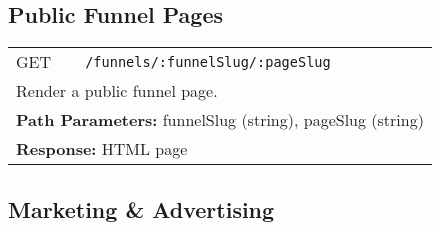 \documentclass[11pt,a4paper]{article}
\begin{document}
\subsection{Public Funnel Pages}
\begin{longtable}{p{2.5cm}p{10cm}}
GET & \texttt{/funnels/:funnelSlug/:pageSlug} \\
\multicolumn{2}{p{13cm}}{Render a public funnel page.} \\
\multicolumn{2}{p{13cm}}{\textbf{Path Parameters:} funnelSlug (string), pageSlug (string)} \\
\multicolumn{2}{p{13cm}}{\textbf{Response:} HTML page} \\
\end{longtable}

\subsection{Marketing \& Advertising}
\end{document}

